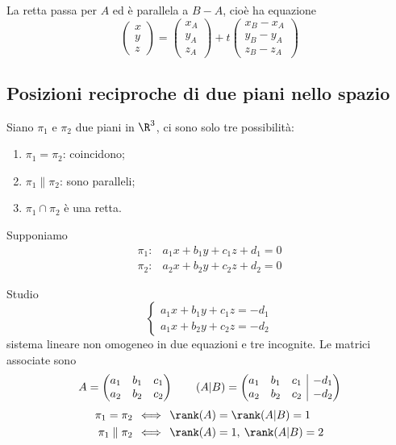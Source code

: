 La retta passa per $ A $ ed è parallela a $ B-A $, cioè ha equazione \[
    \begin{pmatrix}
        x \\ y \\ z
    \end{pmatrix}=\begin{pmatrix}
        x_A \\ y_A \\ z_A
    \end{pmatrix} + t \begin{pmatrix}
        x_{B}-x_{A}   \\ y_{B}-y_{A}   \\ z_{B}-z_{A}  
    \end{pmatrix}
\]

\subsection{Posizioni reciproche di due piani nello spazio}

Siano $ \pi_1 $ e $ \pi_2 $ due piani in $ \R^{3} $, ci sono solo tre possibilità:
\begin{enumerate}
    \item $ \pi_1= \pi_2 $: coincidono;
    \item $ \pi_1 \parallel \pi_2 $: sono paralleli;
    \item $ \pi_1\cap \pi_2 $ è una retta.
\end{enumerate}

Supponiamo \begin{align*}
    \pi_1: &a_1x+b_1y+c_1z+d_1=0\\
    \pi_2: &a_2x+b_2y+c_2z+d_2=0
\end{align*}

Studio \[
    \begin{cases}
        a_1x+b_1y+c_1z=-d_1\\
        a_1x+b_2y+c_2z=-d_2
    \end{cases}
\] sistema lineare non omogeneo in due equazioni e tre incognite. Le matrici associate sono \[
    A=\begin{pmatrix}
        a_1 & b_1 & c_1\\
        a_2 & b_2 & c_2
    \end{pmatrix}\qquad (A|B)=\left(\begin{array}{@{}ccc|c@{}}
        a_1 & b_1 & c_1 & -d_1\\
        a_2 & b_2 & c_2 & -d_2
    \end{array}
    \right)
\]
\begin{align*}
    \pi_1= \pi_2 \,&\iff\, \rank (A )= \rank(A|B)= 1  \\      
    \pi_1\parallel \pi_2\, &\iff\, \rank(A)=1,\: \rank(A|B)=2
\end{align*}